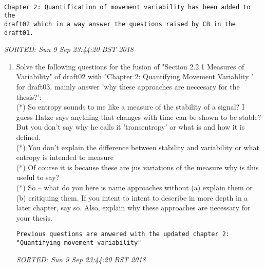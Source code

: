 \documentclass[10pt]{article}
\begin{document}
\begin{verbatim}

Chapter 2: Quantification of movement variability has been added to the 
draft02 which in a way answer the questions raised by CB in the draft01.

\end{verbatim}
\textit{
SORTED: Sun  9 Sep 23:44:20 BST 2018
}
\\


\begin{enumerate}

\item Solve the following questions for the fusion of 
	"Section 2.2.1 Measures of Variability" of draft02 
	with "Chapter 2: Quantifying Movement Variablity " for draft03,
	mainly answer 'why these approaches are neccesary for the thesis?':
	\\ (*) So entropy sounds to me like a measure of the stability 
	of a signal?
	I guess Hatze says anything that changes with time can be shown 
	to be stable?
	But you don't say why he calls it 'transentropy'
	or what is and how it is defined. 
	\\ (*) You don't explain the difference between stability and variability
	or what entropy is intended to measure
	\\ (*) Of course it is because these are jus variations of the measure 
	why is this useful to say? 
	\\ (*) So -- what do you here is name approaches without 
	(a) explain them or 
	(b) critiquing them.
	If you intent to intent to describe in more depth in a later chapter, say so.
	Also, explain why these approaches are necessary for 
	your thesis.

\begin{verbatim}
Previous questions are anwered with the updated chapter 2: 
"Quantifying movement variability"
\end{verbatim}
\textit{
SORTED: Sun  9 Sep 23:44:20 BST 2018
}

	
\end{enumerate}
\end{document}
